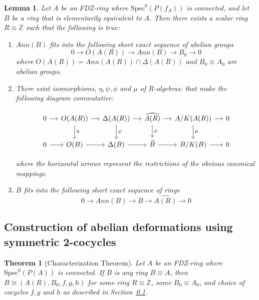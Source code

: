 \documentclass[10pt,a4paper]{amsart}
\newtheorem{lemma}{Lemma}
\newtheorem{theorem}{Theorem}
\def\Z{{\mathbb{Z}}}
\begin{document}
\begin{lemma}\label{lem:6term}
    Let $A$ be an FDZ-ring where $\text{Spec}^0(P(f_A))$ is connected, and let $B$ be a ring that is elementarily equivalent to $A$. Then there exists a scalar ring $R\equiv \Z$ such that the following is true:
    \begin{enumerate}
 \item  $Ann(B)$ fits into the following short exact sequence of abelian groups
    $$ 0\to O(A(R)) \to Ann(B)\to B_0\to 0$$
    where $O(A(R))=Ann(A(R))\cap \Delta(A(R))$ and $B_0\equiv A_0$ are abelian groups.
\item There exist isomorphisms, $\eta, \psi, \phi$ and $\mu$ of $R$-algebras: %
that make the following diagram commutative:

   
$$\begin{tikzcd}[column sep=small]
0 \arrow[r] & O(A(R)) \arrow[r] \arrow[d,"\eta"] &
\Delta(A(R)) \arrow[r] \arrow[d,"\psi"] &
\widehat{A(R)} \arrow[r] \arrow[d,"\phi"] &
A/K(A(R)) \arrow[r] \arrow[d,"\mu"] & 0 \\
0 \arrow[r] & O(B) \arrow[r] &
\Delta(B) \arrow[r] &
\widehat{B} \arrow[r] &
B/K(B) \arrow[r] & 0
\end{tikzcd}$$

where the horizontal arrows represent the restrictions of the obvious canonical mappings.
   \item $B$ fits into the following short exact sequence of rings
    $$0\to Ann(B) \to B \to \widehat{A(R)}\to 0$$ 

   
    \end{enumerate}
     
\end{lemma}

\subsection{Construction of abelian deformations using symmetric 2-cocycles} \label{subsec:cocycles}

\begin{theorem}[Characterization Theorem] Let $A$ be an FDZ-ring where $\text{Spec}^0(P(A))$ is connected. If $B$ is any ring $B\equiv A$, then
$B\cong (A(R),B_0, f,g,h)$
for some ring $R\equiv \Z$, some $B_0\equiv A_0$, and choice of cocycles $f,g$ and $h$ as described in Section~\ref{subsec:cocycles}.   
\end{theorem}
\end{document}
